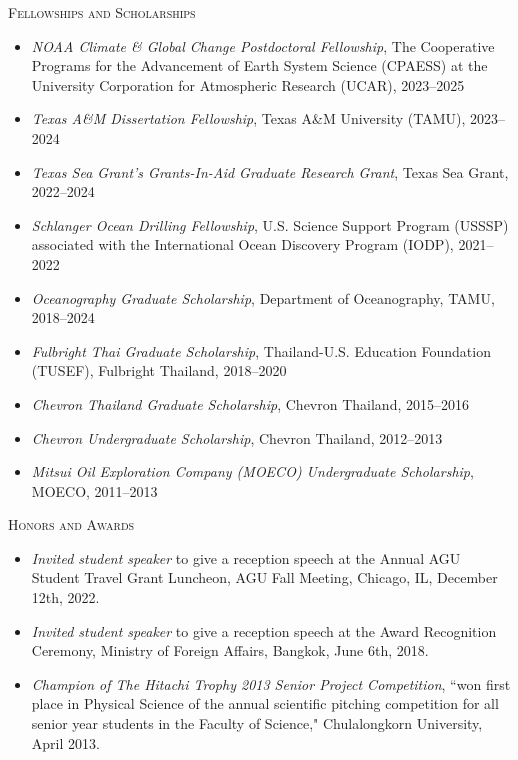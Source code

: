 \documentclass[10pt, letter]{article}
\newcommand{\margintext}[1]{\marginnote{\normalsize\textbf #1 |}}
\begin{document}
\pagestyle{fancy}

\fancyfoot{} %

\bigskip
\margintext{Awards}
\textsc{Fellowships and Scholarships}
\begin{itemize}[leftmargin=*]
    \item[] \emph{NOAA Climate \& Global Change Postdoctoral Fellowship}, The Cooperative Programs for the Advancement of Earth System Science (CPAESS) at the University Corporation for Atmospheric Research (UCAR), 2023–2025
    \item[] \emph{Texas A\&M Dissertation Fellowship}, Texas A\&M University (TAMU), 2023–2024
    \item[] \emph{Texas Sea Grant's Grants-In-Aid Graduate Research Grant}, Texas Sea Grant, 2022–2024
    \item[] \emph{Schlanger Ocean Drilling Fellowship}, U.S. Science Support Program (USSSP) associated with the International Ocean Discovery Program (IODP), 2021–2022
    \item[] \emph{Oceanography Graduate Scholarship}, Department of Oceanography, TAMU, 2018–2024
    \item[] \emph{Fulbright Thai Graduate Scholarship}, Thailand-U.S. Education Foundation (TUSEF), Fulbright Thailand, 2018–2020
    \item[] \emph{Chevron Thailand Graduate Scholarship}, Chevron Thailand, 2015–2016
    \item[] \emph{Chevron Undergraduate Scholarship}, Chevron Thailand, 2012–2013
    \item[] \emph{Mitsui Oil Exploration Company (MOECO) Undergraduate Scholarship}, MOECO, 2011–2013 

\end{itemize}

\textsc{Honors and Awards}
\begin{itemize}[leftmargin=*]
    \item[] \emph{Invited student speaker} to give a reception speech at the Annual AGU Student Travel Grant Luncheon, AGU Fall Meeting, Chicago, IL, December 12th, 2022.
    \item[] \emph{Invited student speaker} to give a reception speech at the Award Recognition Ceremony, Ministry of Foreign Affairs, Bangkok, June 6th, 2018.
    \item[] \emph{Champion of The Hitachi Trophy 2013 Senior Project Competition}, ``won first place in Physical Science of the annual scientific pitching competition for all senior year students in the Faculty of Science," Chulalongkorn University, April 2013.
\end{itemize}
\end{document}
